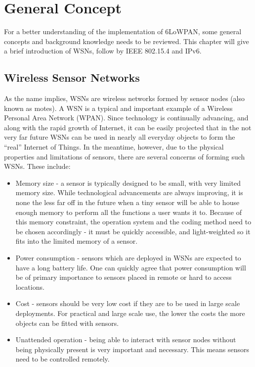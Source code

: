 \chapter{General Concept}
\label{General:2.0}
For a better understanding of the implementation of 6LoWPAN, some general concepts and background knowledge needs to be reviewed. This chapter will give a brief introduction of WSNs, follow by IEEE 802.15.4 and IPv6.

\section{Wireless Sensor Networks}
\label{General:WSN}

As the name implies, WSNs are wireless networks formed by sensor
nodes (also known as motes)\@. A WSN is a typical and important example of a Wireless Personal
Area Network (WPAN)\@. Since technology is continually advancing, and along with the rapid growth of Internet, it can be easily projected that in the not very far future WSNs can be used in nearly all everyday objects to form the ``real'' Internet of Things. In the meantime, however, due to the physical properties and limitations of sensors, there are several concerns of forming such WSNs. These include:

\begin{itemize}
\item Memory size - a sensor is typically designed to be small, with very limited memory
size. While technological advancements are always improving, it is none the less far off in the future when a tiny sensor will be able to house enough memory to perform all the functions a user wants it to. Because of this memory constraint, the operation system and the coding method need to be chosen accordingly - it must be quickly accessible, and light-weighted so it fits into the limited memory of a sensor.
\newline

\item Power consumption - sensors which are deployed in WSNs are expected to have a long battery life.  One can quickly agree that power consumption will be of primary importance to sensors placed in remote or hard to access locations.
\newline

\item Cost - sensors should be very low cost if they are to be used in large scale deployments.  For practical and large scale use, the lower the costs the more objects can be fitted with sensors.
\newline

\item  Unattended operation - being able to interact with sensor nodes without being physically
present is very important and necessary.  This means sensors need to be controlled remotely. 
\end{itemize}

